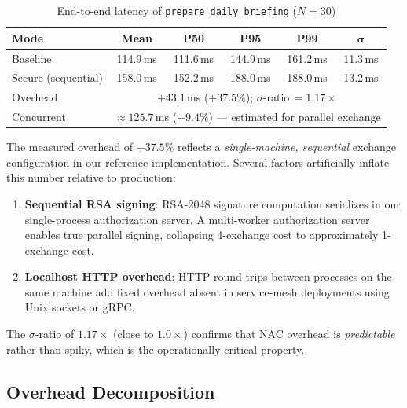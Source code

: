 \documentclass[journal]{IEEEtran}
\begin{document}
\begin{table}[h]
\caption{End-to-end latency of \texttt{prepare\_daily\_briefing} ($N=30$)}
\label{tab:latency}
\centering
\footnotesize
\begin{tabular}{lccccc}
\toprule
\textbf{Mode} & \textbf{Mean} & \textbf{P50} & \textbf{P95} & \textbf{P99} & $\boldsymbol\sigma$ \\
\midrule
Baseline             & 114.9\,ms & 111.6\,ms & 144.9\,ms & 161.2\,ms & 11.3\,ms \\
Secure (sequential)  & 158.0\,ms & 152.2\,ms & 188.0\,ms & 188.0\,ms & 13.2\,ms \\
\midrule
Overhead   & \multicolumn{5}{c}{$+43.1$\,ms ($+37.5\%$); $\sigma$-ratio\,$=1.17\times$} \\
Concurrent & \multicolumn{5}{c}{$\approx125.7$\,ms ($+9.4\%$) — estimated for parallel exchange} \\
\bottomrule
\end{tabular}
\end{table}

The measured overhead of $+37.5\%$ reflects a \textit{single-machine, sequential}
exchange configuration in our reference implementation. Several factors artificially
inflate this number relative to production:

\begin{enumerate}
  \item \textbf{Sequential RSA signing}: RSA-2048 signature computation
        serializes in our single-process authorization server. A multi-worker
        authorization server enables true parallel signing, collapsing 4-exchange
        cost to approximately 1-exchange cost.
  \item \textbf{Localhost HTTP overhead}: HTTP round-trips between processes
        on the same machine add fixed overhead absent in service-mesh deployments
        using Unix sockets or gRPC.
\end{enumerate}

The $\sigma$-ratio of $1.17\times$ (close to $1.0\times$) confirms that NAC
overhead is \textit{predictable} rather than spiky, which is the operationally
critical property.

\subsection{Overhead Decomposition}
\end{document}
